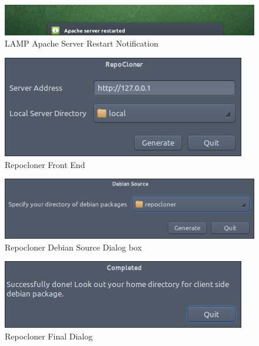 \begin{figure}[h]
\begin{center}
  \includegraphics[scale=0.69] {28.png}
  \caption[Screenshot - LAMP Apache Server Restart Notification]{LAMP Apache Server Restart Notification}
\end{center}
\end{figure}
\newpage
\begin{figure}[h]
\begin{center}
  \includegraphics[scale=0.89] {29.png}
  \caption[Screenshot - Repocloner Front End]{Repocloner Front End}
\end{center}
\end{figure}
\begin{figure}[h]
\begin{center}
  \includegraphics[scale=0.89] {30.png}
  \caption[Screenshot - Repocloner Debian Source Dialog box]{Repocloner Debian Source Dialog box}
\end{center}
\end{figure}\begin{figure}[h]
\begin{center}
  \includegraphics[scale=0.89] {31.png}
  \caption[Screenshot - Repocloner Final Dialog]{Repocloner Final Dialog}
\end{center}
\end{figure}
